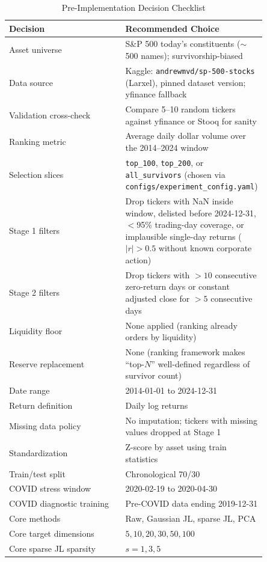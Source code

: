 \documentclass[11pt]{article}
\begin{document}
\begin{table}[H]
\centering
\caption{Pre-Implementation Decision Checklist}
\begin{tabular}{p{0.45\linewidth} p{0.40\linewidth}}
\toprule
\textbf{Decision} & \textbf{Recommended Choice} \\
\midrule
Asset universe & S\&P 500 today's constituents ($\sim$500 names); survivorship-biased \\
Data source & Kaggle: \texttt{andrewmvd/sp-500-stocks} (Larxel), pinned dataset version; yfinance fallback \\
Validation cross-check & Compare 5--10 random tickers against yfinance or Stooq for sanity \\
Ranking metric & Average daily dollar volume over the 2014--2024 window \\
Selection slices & \texttt{top\_100}, \texttt{top\_200}, or \texttt{all\_survivors} (chosen via \texttt{configs/experiment\_config.yaml}) \\
Stage 1 filters & Drop tickers with NaN inside window, delisted before 2024-12-31, $<$95\% trading-day coverage, or implausible single-day returns ($|r| > 0.5$ without known corporate action) \\
Stage 2 filters & Drop tickers with $>10$ consecutive zero-return days or constant adjusted close for $>5$ consecutive days \\
Liquidity floor & None applied (ranking already orders by liquidity) \\
Reserve replacement & None (ranking framework makes ``top-$N$'' well-defined regardless of survivor count) \\
Date range & 2014-01-01 to 2024-12-31 \\
Return definition & Daily log returns \\
Missing data policy & No imputation; tickers with missing values dropped at Stage 1 \\
Standardization & Z-score by asset using train statistics \\
Train/test split & Chronological 70/30 \\
COVID stress window & 2020-02-19 to 2020-04-30 \\
COVID diagnostic training & Pre-COVID data ending 2019-12-31 \\
Core methods & Raw, Gaussian JL, sparse JL, PCA \\
Core target dimensions & $5,10,20,30,50,100$ \\
Core sparse JL sparsity & $s=1,3,5$ \\

\end{tabular}
\end{table}
\end{document}
